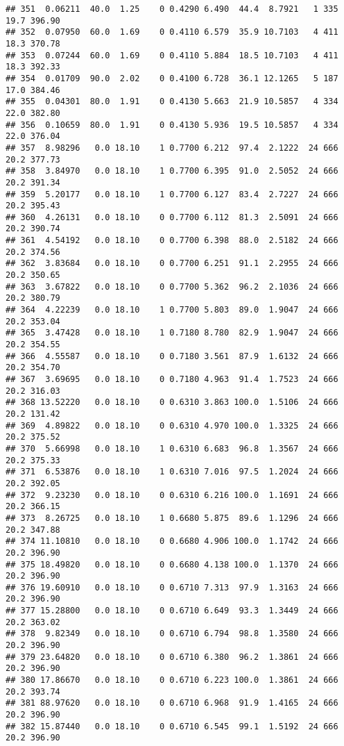 \documentclass[
]{article}
\begin{document}
\begin{verbatim}
## 351  0.06211  40.0  1.25    0 0.4290 6.490  44.4  8.7921   1 335    19.7 396.90
## 352  0.07950  60.0  1.69    0 0.4110 6.579  35.9 10.7103   4 411    18.3 370.78
## 353  0.07244  60.0  1.69    0 0.4110 5.884  18.5 10.7103   4 411    18.3 392.33
## 354  0.01709  90.0  2.02    0 0.4100 6.728  36.1 12.1265   5 187    17.0 384.46
## 355  0.04301  80.0  1.91    0 0.4130 5.663  21.9 10.5857   4 334    22.0 382.80
## 356  0.10659  80.0  1.91    0 0.4130 5.936  19.5 10.5857   4 334    22.0 376.04
## 357  8.98296   0.0 18.10    1 0.7700 6.212  97.4  2.1222  24 666    20.2 377.73
## 358  3.84970   0.0 18.10    1 0.7700 6.395  91.0  2.5052  24 666    20.2 391.34
## 359  5.20177   0.0 18.10    1 0.7700 6.127  83.4  2.7227  24 666    20.2 395.43
## 360  4.26131   0.0 18.10    0 0.7700 6.112  81.3  2.5091  24 666    20.2 390.74
## 361  4.54192   0.0 18.10    0 0.7700 6.398  88.0  2.5182  24 666    20.2 374.56
## 362  3.83684   0.0 18.10    0 0.7700 6.251  91.1  2.2955  24 666    20.2 350.65
## 363  3.67822   0.0 18.10    0 0.7700 5.362  96.2  2.1036  24 666    20.2 380.79
## 364  4.22239   0.0 18.10    1 0.7700 5.803  89.0  1.9047  24 666    20.2 353.04
## 365  3.47428   0.0 18.10    1 0.7180 8.780  82.9  1.9047  24 666    20.2 354.55
## 366  4.55587   0.0 18.10    0 0.7180 3.561  87.9  1.6132  24 666    20.2 354.70
## 367  3.69695   0.0 18.10    0 0.7180 4.963  91.4  1.7523  24 666    20.2 316.03
## 368 13.52220   0.0 18.10    0 0.6310 3.863 100.0  1.5106  24 666    20.2 131.42
## 369  4.89822   0.0 18.10    0 0.6310 4.970 100.0  1.3325  24 666    20.2 375.52
## 370  5.66998   0.0 18.10    1 0.6310 6.683  96.8  1.3567  24 666    20.2 375.33
## 371  6.53876   0.0 18.10    1 0.6310 7.016  97.5  1.2024  24 666    20.2 392.05
## 372  9.23230   0.0 18.10    0 0.6310 6.216 100.0  1.1691  24 666    20.2 366.15
## 373  8.26725   0.0 18.10    1 0.6680 5.875  89.6  1.1296  24 666    20.2 347.88
## 374 11.10810   0.0 18.10    0 0.6680 4.906 100.0  1.1742  24 666    20.2 396.90
## 375 18.49820   0.0 18.10    0 0.6680 4.138 100.0  1.1370  24 666    20.2 396.90
## 376 19.60910   0.0 18.10    0 0.6710 7.313  97.9  1.3163  24 666    20.2 396.90
## 377 15.28800   0.0 18.10    0 0.6710 6.649  93.3  1.3449  24 666    20.2 363.02
## 378  9.82349   0.0 18.10    0 0.6710 6.794  98.8  1.3580  24 666    20.2 396.90
## 379 23.64820   0.0 18.10    0 0.6710 6.380  96.2  1.3861  24 666    20.2 396.90
## 380 17.86670   0.0 18.10    0 0.6710 6.223 100.0  1.3861  24 666    20.2 393.74
## 381 88.97620   0.0 18.10    0 0.6710 6.968  91.9  1.4165  24 666    20.2 396.90
## 382 15.87440   0.0 18.10    0 0.6710 6.545  99.1  1.5192  24 666    20.2 396.90

\end{verbatim}
\end{document}
